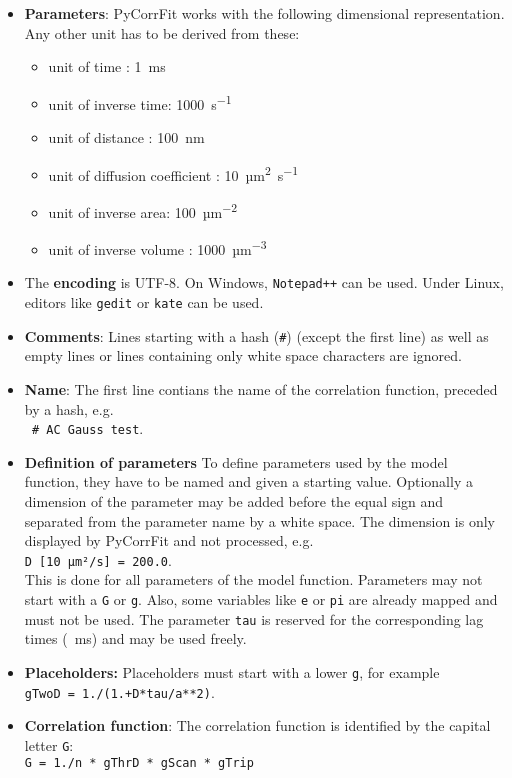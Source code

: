 \begin{itemize}

\item \textbf{Parameters}: PyCorrFit works with the following dimensional representation. Any other unit has to be derived from these:
	\begin{itemize}
	\item unit of time        : \SI{1}{ms}
	\item  unit of inverse time: \SI{1000}{s^{-1}}
	\item  unit of distance    : \SI{100}{nm}
	\item  unit of diffusion coefficient  : \SI{10}{µm^2s^{-1}}
	\item  unit of inverse area: \SI{100}{µm^{-2}}
	\item  unit of inverse volume : \SI{1000}{µm^{-3}}
	\end{itemize}


\item The \textbf{encoding} is UTF-8. On Windows, \texttt{Notepad++} can be used. Under Linux, editors like \texttt{gedit} or \texttt{kate} can be used. 


\item \textbf{Comments}: Lines starting with a hash (\texttt{\#}) (except the first line) as well as empty lines or lines containing only white space characters are ignored.

\item \textbf{Name}: The first line contians the name of the correlation function, preceded by a hash, e.g.\\ \texttt{ \# AC Gauss test}.

\item \textbf{Definition of parameters} To define parameters used by the model function, they have to be named and given a starting value. Optionally a dimension of the parameter may be added before the equal sign and separated from the parameter name by a white space. The dimension is only displayed by PyCorrFit and not processed, e.g. 
\\ \texttt{D [10 µm²/s] = 200.0}.\\
This is done for all parameters of the model function. Parameters may not start with a \texttt{G} or \texttt{g}. Also, some variables like \texttt{e} or \texttt{pi} are already mapped and must not be used. The parameter \texttt{tau} is reserved for the corresponding lag times (\SI{}{ms}) and may be used freely.

\item \textbf{Placeholders:} Placeholders must start with a lower \texttt{g}, for example \\  \texttt{gTwoD = 1./(1.+D*tau/a**2)}. 

\item \textbf{Correlation function}: The correlation function is identified by the capital letter \texttt{G}: \\
\texttt{G = 1./n * gThrD * gScan * gTrip}
\end{itemize}

